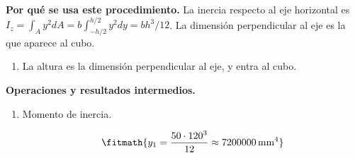 \noindent\textbf{Por qué se usa este procedimiento.} La inercia respecto al eje horizontal es $I_z=\int_A y^2dA=b\int_{-h/2}^{h/2}y^2dy=bh^3/12$. La dimensión perpendicular al eje es la que aparece al cubo.

\begin{enumerate}

\item La altura es la dimensión perpendicular al eje, y entra al cubo.

\end{enumerate}

\noindent\textbf{Operaciones y resultados intermedios.}

\begin{enumerate}

\item Momento de inercia.

\[\fitmath{y_{1}=\frac{50\cdot {120}^{3}}{12}\approx 7200000\,\mathrm{mm^{4}}}\]

\end{enumerate}
